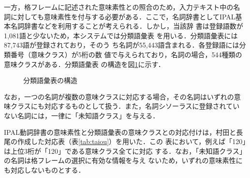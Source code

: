 一方，格フレームに記述された意味素性との照合のため，入力テキスト中の名
詞に対しても意味素性を付与する必要がある．ここで，名詞辞書としてIPAL基
本名詞辞書\cite{ipal96}などを利用することが考えられる．しかし，当該辞
書は登録語数が1,081語と少ないため，本システムでは分類語彙表
\cite{koku64}を用いる．分類語彙表には87,743語が登録されており，そのう
ち名詞が55,443語含まれる．各登録語には分類番号（意味クラス）が5桁の数
値で与えられており，名詞の場合，544種類の意味クラスがある．分類語彙表
の構造を図\ref{fig:bunruigoihyou}に示す．
\begin{figure}[htbp]
  \begin{center}
    \caption{分類語彙表の構造}
    \label{fig:bunruigoihyou}
  \end{center}
\end{figure}

なお，一つの名詞が複数の意味クラスに対応する場合，その名詞はいずれの意
味クラスにも対応するものとして扱う．また，名詞シソーラスに登録されてい
ない名詞には，一律に「未知語クラス」を与える．

IPAL動詞辞書の意味素性と分類語彙表の意味クラスとの対応付けは，村田と長
尾\citeyear{mura97}の作成した対応表（表\ref{tab:taiou}）を用いた．この
表において，例えば「120」は上位3桁が「120」である意味クラス全てに対応
する．なお，「未知語クラス」の名詞は格フレームの選択に有効な情報を与え
ないため，いずれの意味素性にも対応しないものとする．

